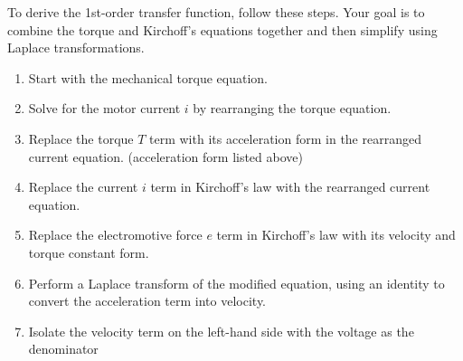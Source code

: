 \documentclass[openany,11pt,fleqn]{book} %
\begin{document}
To derive the 1st-order transfer function, follow these steps. Your goal is to combine the torque and Kirchoff's equations together and then simplify using Laplace transformations. 
\begin{enumerate}
    \item Start with the mechanical torque equation. 
    \item Solve for the motor current $i$ by rearranging the torque equation. 
    \item Replace the torque $T$ term with its acceleration form in the rearranged current equation. (acceleration form listed above)  
    \item Replace the current $i$ term in Kirchoff's law with the rearranged current equation.
    \item Replace the electromotive force $e$ term in Kirchoff's law with its velocity and torque constant form. 
    \item Perform a Laplace transform of the modified equation, using an identity to convert the acceleration term into velocity. 
    \item Isolate the velocity term on the left-hand side with the voltage as the denominator
\end{enumerate}




\end{document}

